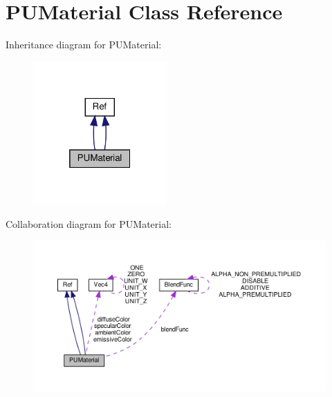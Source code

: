 \hypertarget{classPUMaterial}{}\section{P\+U\+Material Class Reference}
\label{classPUMaterial}


Inheritance diagram for P\+U\+Material\+:
\nopagebreak
\begin{figure}[H]
\begin{center}
\leavevmode
\includegraphics[width=145pt]{classPUMaterial__inherit__graph}
\end{center}
\end{figure}


Collaboration diagram for P\+U\+Material\+:
\nopagebreak
\begin{figure}[H]
\begin{center}
\leavevmode
\includegraphics[width=350pt]{classPUMaterial__coll__graph}
\end{center}
\end{figure}
